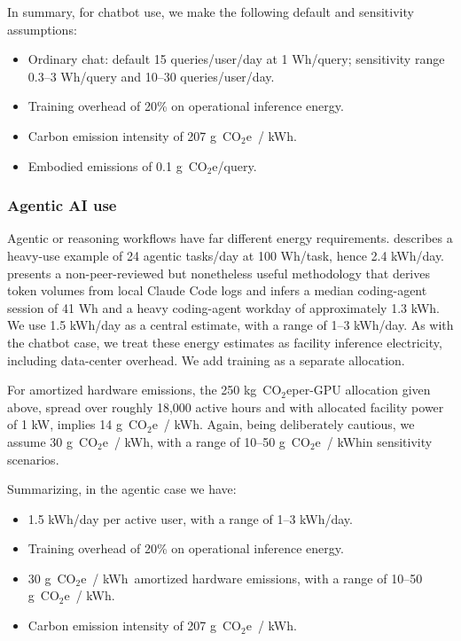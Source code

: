 \documentclass[11pt]{article}
\newcommand{\coe}{CO$_2$e}
\newcommand{\gcoe}{g~\coe}
\newcommand{\kgcoe}{k\gcoe}
\newcommand{\gcoekwh}{\gcoe\ / kWh}
\begin{document}
In summary, for chatbot use, we make the following default and sensitivity assumptions:

\begin{itemize}
  \item Ordinary chat: default 15 queries/user/day at 1 Wh/query; sensitivity
  range 0.3--3 Wh/query and 10--30 queries/user/day.
  \item Training overhead of 20\% on operational inference energy.
  \item Carbon emission intensity of 207 \gcoekwh.
  \item Embodied emissions of 0.1 \gcoe/query.
\end{itemize}

\subsubsection*{Agentic AI use}

Agentic or reasoning workflows have far different energy requirements.
\textcite{ritchie:ai:electricity:2026} describes a heavy-use example of 24
agentic tasks/day at 100 Wh/task, hence 2.4 kWh/day.
\textcite{couch:claude:code:energy} presents a non-peer-reviewed but nonetheless
useful methodology that derives token volumes from local Claude Code logs and
infers a median coding-agent session of 41 Wh and a heavy coding-agent workday
of approximately 1.3 kWh. We use 1.5 kWh/day as a central estimate, with a range
of 1--3 kWh/day. As with the chatbot case, we treat these energy estimates as
facility inference electricity, including data-center overhead. We add training
as a separate allocation.

For amortized hardware emissions, the 250 \kgcoe per-GPU allocation given above,
spread over roughly 18,000 active hours and with allocated facility power of 1
kW, implies 14 \gcoekwh. Again, being deliberately cautious, we assume 30
\gcoekwh, with a range of 10--50 \gcoekwh in sensitivity scenarios.

Summarizing, in the agentic case we have:

\begin{itemize}
  \item 1.5 kWh/day per active user, with a range of 1--3 kWh/day.
  \item Training overhead of 20\% on operational inference energy.
  \item 30 \gcoekwh\ amortized hardware emissions, with a range of 10--50
  \gcoekwh.
  \item Carbon emission intensity of 207 \gcoekwh.
\end{itemize}
\end{document}
